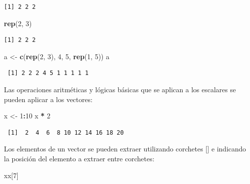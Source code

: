 \documentclass[
]{article}
\newenvironment{Shaded}{\begin{snugshade}}{\end{snugshade}}
\newcommand{\DecValTok}[1]{\textcolor[rgb]{0.00,0.00,0.81}{#1}}
\newcommand{\FunctionTok}[1]{\textcolor[rgb]{0.13,0.29,0.53}{\textbf{#1}}}
\newcommand{\NormalTok}[1]{#1}
\newcommand{\OtherTok}[1]{\textcolor[rgb]{0.56,0.35,0.01}{#1}}
\newcommand{\SpecialCharTok}[1]{\textcolor[rgb]{0.81,0.36,0.00}{\textbf{#1}}}
\begin{document}
\begin{verbatim}
[1] 2 2 2
\end{verbatim}

\begin{Shaded}
\begin{Highlighting}[]
\FunctionTok{rep}\NormalTok{(}\DecValTok{2}\NormalTok{, }\DecValTok{3}\NormalTok{)}
\end{Highlighting}
\end{Shaded}

\begin{verbatim}
[1] 2 2 2
\end{verbatim}

\begin{Shaded}
\begin{Highlighting}[]
\NormalTok{a }\OtherTok{\textless{}{-}} \FunctionTok{c}\NormalTok{(}\FunctionTok{rep}\NormalTok{(}\DecValTok{2}\NormalTok{, }\DecValTok{3}\NormalTok{), }\DecValTok{4}\NormalTok{, }\DecValTok{5}\NormalTok{, }\FunctionTok{rep}\NormalTok{(}\DecValTok{1}\NormalTok{, }\DecValTok{5}\NormalTok{))}
\NormalTok{a}
\end{Highlighting}
\end{Shaded}

\begin{verbatim}
 [1] 2 2 2 4 5 1 1 1 1 1
\end{verbatim}

Las operaciones aritméticas y lógicas básicas que se aplican a los escalares se pueden aplicar a los vectores:

\begin{Shaded}
\begin{Highlighting}[]
\NormalTok{x }\OtherTok{\textless{}{-}} \DecValTok{1}\SpecialCharTok{:}\DecValTok{10}
\NormalTok{x }\SpecialCharTok{*} \DecValTok{2}
\end{Highlighting}
\end{Shaded}

\begin{verbatim}
 [1]  2  4  6  8 10 12 14 16 18 20
\end{verbatim}

Los elementos de un vector se pueden extraer utilizando corchetes {[}{]} e indicando la posición del elemento a extraer entre corchetes:

\begin{Shaded}
\begin{Highlighting}[]
\NormalTok{xx[}\DecValTok{7}\NormalTok{]}
\end{Highlighting}
\end{Shaded}
\end{document}
